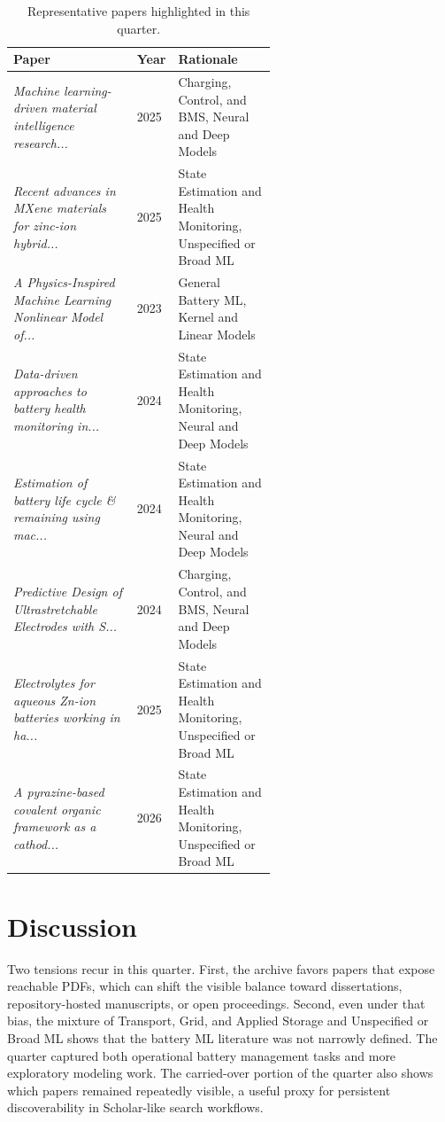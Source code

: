 \documentclass[conference]{IEEEtran}
\begin{document}
\begin{table}[t]
\caption{Representative papers highlighted in this quarter.}
\label{tab:notable}
\centering
\footnotesize
\begin{tabularx}{\linewidth}{p{0.47\linewidth} p{0.12\linewidth} X}
\toprule
Paper & Year & Rationale \\
\midrule
\textit{Machine learning-driven material intelligence research...} \cite{machinelearningdriven2025} & 2025 & Charging, Control, and BMS, Neural and Deep Models \\
\textit{Recent advances in MXene materials for zinc-ion hybrid...} \cite{recentadvancesin2025} & 2025 & State Estimation and Health Monitoring, Unspecified or Broad ML \\
\textit{A Physics-Inspired Machine Learning Nonlinear Model of...} \cite{aphysicsinspired2023} & 2023 & General Battery ML, Kernel and Linear Models \\
\textit{Data-driven approaches to battery health monitoring in...} \cite{datadrivenapproaches2024} & 2024 & State Estimation and Health Monitoring, Neural and Deep Models \\
\textit{Estimation of battery life cycle \& remaining using mac...} \cite{estimationofbattery2024} & 2024 & State Estimation and Health Monitoring, Neural and Deep Models \\
\textit{Predictive Design of Ultrastretchable Electrodes with S...} \cite{predictivedesignof2024} & 2024 & Charging, Control, and BMS, Neural and Deep Models \\
\textit{Electrolytes for aqueous Zn-ion batteries working in ha...} \cite{electrolytesforaqueous2025} & 2025 & State Estimation and Health Monitoring, Unspecified or Broad ML \\
\textit{A pyrazine-based covalent organic framework as a cathod...} \cite{apyrazinebased2026} & 2026 & State Estimation and Health Monitoring, Unspecified or Broad ML \\
\bottomrule
\end{tabularx}
\end{table}

\section{Discussion}
Two tensions recur in this quarter. First, the archive favors papers that expose reachable PDFs, which can shift the visible balance toward dissertations, repository-hosted manuscripts, or open proceedings. Second, even under that bias, the mixture of Transport, Grid, and Applied Storage and Unspecified or Broad ML shows that the battery ML literature was not narrowly defined. The quarter captured both operational battery management tasks and more exploratory modeling work. The carried-over portion of the quarter also shows which papers remained repeatedly visible, a useful proxy for persistent discoverability in Scholar-like search workflows.
\end{document}
